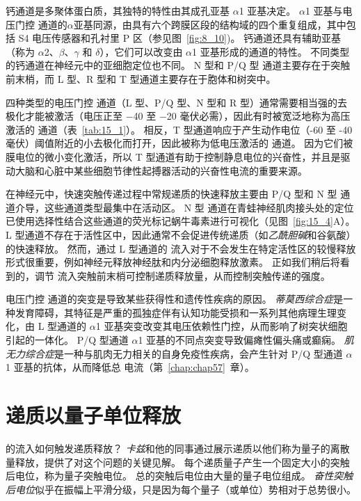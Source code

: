 钙通道是多聚体蛋白质，其独特的特性由其成孔亚基 $\alpha$1 亚基决定。
$\alpha$1 亚基与电压门控  通道的$\alpha$亚基同源，由具有六个跨膜区段的结构域的四个重复组成，其中包括 S4 电压传感器和孔衬里 P 区（参见图~\ref{fig:8_10})。
钙通道还具有辅助亚基（称为 $\alpha$2、$\beta$、$\gamma$ 和 $\delta$），它们可以改变由 $\alpha$1 亚基形成的通道的特性。
不同类型的钙通道在神经元中的亚细胞定位也不同。
N 型和 P/Q 型  通道主要存在于突触前末梢，而 L 型、R 型和 T 型通道主要存在于胞体和树突中。


四种类型的电压门控  通道（L 型、P/Q 型、N 型和 R 型）通常需要相当强的去极化才能被激活（电压正至 −40 至 −20 毫伏必需），因此有时被宽泛地称为高压激活的  通道（表~\ref{tab:15_1}）。
相反，T 型通道响应于产生动作电位（-60 至 -40 毫伏）阈值附近的小去极化而打开，因此被称为低电压激活的  通道。
因为它们被膜电位的微小变化激活，所以 T 型通道有助于控制静息电位的兴奋性，并且是驱动大脑和心脏中某些细胞节律性起搏器活动的兴奋性电流的重要来源。


在神经元中，快速突触传递过程中常规递质的快速释放主要由 P/Q 型和 N 型  通道介导，这些通道类型最集中在活动区。
N 型  通道在青蛙神经肌肉接头处的定位已使用选择性结合这些通道的荧光标记蜗牛毒素进行可视化（见图~\ref{fig:15_4}A）。
L 型通道不存在于活性区中，因此通常不会促进传统递质（如\textit{乙酰胆碱}和谷氨酸）的快速释放。
然而，通过 L 型通道的  流入对于不会发生在特定活性区的较慢释放形式很重要，例如神经元释放神经肽和内分泌细胞释放激素。
正如我们稍后将看到的，调节  流入突触前末梢可控制递质释放量，从而控制突触传递的强度。


电压门控  通道的突变是导致某些获得性和遗传性疾病的原因。
\textit{蒂莫西综合症}是一种发育障碍，其特征是严重的孤独症伴有认知功能受损和一系列其他病理生理变化，由 L 型通道的 $\alpha$1 亚基突变改变其电压依赖性门控，从而影响了树突状细胞引起的一体化。
P/Q 型通道 $\alpha$1 亚基的不同点突变导致偏瘫性偏头痛或癫痫。
\textit{肌无力综合症}是一种与肌肉无力相关的自身免疫性疾病，会产生针对 P/Q 型通道 $\alpha$1 亚基的抗体，从而降低总  电流（第~\ref{chap:chap57}~章）。



\section{递质以量子单位释放}

的流入如何触发递质释放？
\textit{卡兹}和他的同事通过展示递质以他们称为量子的离散量释放，提供了对这个问题的关键见解。
每个递质量子产生一个固定大小的突触后电位，称为量子突触电位。
总的突触后电位由大量的量子电位组成。
\textit{奋性突触后电位}似乎在振幅上平滑分级，只是因为每个量子（或单位）势相对于总势很小。


